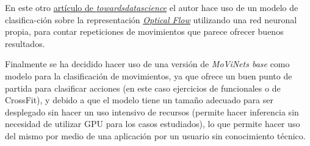En este otro \href{https://towardsdatascience.com/how-i-created-the-workout-movement-counting-app-using-deep-learning-and-optical-flow-89f9d2e087ac}{artículo de \textit{towardsdatascience}} el autor hace uso de un modelo de clasifica-ción sobre la representación \href{https://docs.opencv.org/3.4/d4/dee/tutorial_optical_flow.html}{\textit{Optical Flow}} utilizando una red neuronal propia, para contar repeticiones de movimientos que parece ofrecer buenos resultados.

Finalmente se ha decidido hacer uso de una versión de \textit{MoViNets base} como modelo para la clasificación de movimientos, ya que ofrece un buen punto de partida para clasificar acciones (en este caso ejercicios de funcionales o de CrossFit), y debido a que el modelo tiene un tamaño adecuado para ser desplegado sin hacer un uso intensivo de recursos (permite hacer inferencia sin necesidad de utilizar GPU para los casos estudiados), lo que permite hacer uso del mismo por medio de una aplicación por un usuario sin conocimiento técnico.

